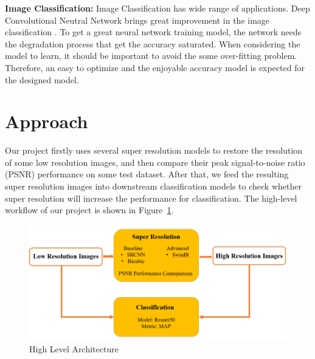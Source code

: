 \documentclass[10pt,twocolumn,letterpaper]{article}
\begin{document}
\textbf{Image Classification: }
Image Classification has wide range of applications. Deep Convolutional Neutral Network brings great improvement in the image classification \cite{https://doi.org/10.48550/arxiv.1512.03385}. To get a great neural network training model, the network needs the degradation process that get the accuracy saturated. When considering the model to learn, it should be important to avoid the some over-fitting problem. Therefore, an easy to optimize and the enjoyable accuracy model is expected for the designed model\cite{https://doi.org/10.48550/arxiv.1512.03385}. 

\section{Approach}
Our project firstly uses several super resolution models to restore the resolution of some low resolution images, and then compare their peak signal-to-noise ratio (PSNR) performance on some test dataset. After that, we feed the resulting super resolution images into downstream classification models to check whether super resolution will increase the performance for classification. The high-level workflow of our project is shown in Figure~\ref{fig:highlevel}.
\begin{figure}
    \centering
    \includegraphics[width=\linewidth]{Workflow.png}
    \caption{High Level Architecture}
    \label{fig:highlevel}
\end{figure}
\end{document}
